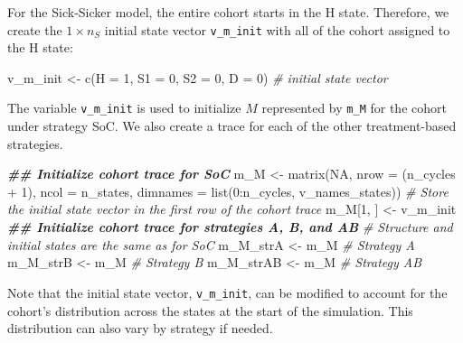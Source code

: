 \documentclass[
]{article}
\newenvironment{Shaded}{\begin{snugshade}}{\end{snugshade}}
\newcommand{\AttributeTok}[1]{\textcolor[rgb]{0.77,0.63,0.00}{#1}}
\newcommand{\CommentTok}[1]{\textcolor[rgb]{0.56,0.35,0.01}{\textit{#1}}}
\newcommand{\ConstantTok}[1]{\textcolor[rgb]{0.00,0.00,0.00}{#1}}
\newcommand{\DecValTok}[1]{\textcolor[rgb]{0.00,0.00,0.81}{#1}}
\newcommand{\DocumentationTok}[1]{\textcolor[rgb]{0.56,0.35,0.01}{\textbf{\textit{#1}}}}
\newcommand{\FunctionTok}[1]{\textcolor[rgb]{0.00,0.00,0.00}{#1}}
\newcommand{\NormalTok}[1]{#1}
\newcommand{\OtherTok}[1]{\textcolor[rgb]{0.56,0.35,0.01}{#1}}
\newcommand{\SpecialCharTok}[1]{\textcolor[rgb]{0.00,0.00,0.00}{#1}}
\begin{document}
For the Sick-Sicker model, the entire cohort starts in the H state. Therefore, we create the \(1 \times n_S\) initial state vector \texttt{v\_m\_init} with all of the cohort assigned to the H state:

\begin{Shaded}
\begin{Highlighting}[]
\NormalTok{v\_m\_init }\OtherTok{\textless{}{-}} \FunctionTok{c}\NormalTok{(}\AttributeTok{H =} \DecValTok{1}\NormalTok{, }\AttributeTok{S1 =} \DecValTok{0}\NormalTok{, }\AttributeTok{S2 =} \DecValTok{0}\NormalTok{, }\AttributeTok{D =} \DecValTok{0}\NormalTok{) }\CommentTok{\# initial state vector}
\end{Highlighting}
\end{Shaded}

The variable \texttt{v\_m\_init} is used to initialize \(M\) represented by \texttt{m\_M} for the cohort under strategy SoC. We also create a trace for each of the other treatment-based strategies.

\begin{Shaded}
\begin{Highlighting}[]
\DocumentationTok{\#\# Initialize cohort trace for SoC}
\NormalTok{m\_M }\OtherTok{\textless{}{-}} \FunctionTok{matrix}\NormalTok{(}\ConstantTok{NA}\NormalTok{, }
              \AttributeTok{nrow =}\NormalTok{ (n\_cycles }\SpecialCharTok{+} \DecValTok{1}\NormalTok{), }\AttributeTok{ncol =}\NormalTok{ n\_states, }
              \AttributeTok{dimnames =} \FunctionTok{list}\NormalTok{(}\DecValTok{0}\SpecialCharTok{:}\NormalTok{n\_cycles, v\_names\_states))}
\CommentTok{\# Store the initial state vector in the first row of the cohort trace}
\NormalTok{m\_M[}\DecValTok{1}\NormalTok{, ] }\OtherTok{\textless{}{-}}\NormalTok{ v\_m\_init}
\DocumentationTok{\#\# Initialize cohort trace for strategies A, B, and AB}
\CommentTok{\# Structure and initial states are the same as for SoC}
\NormalTok{m\_M\_strA  }\OtherTok{\textless{}{-}}\NormalTok{ m\_M }\CommentTok{\# Strategy A}
\NormalTok{m\_M\_strB  }\OtherTok{\textless{}{-}}\NormalTok{ m\_M }\CommentTok{\# Strategy B}
\NormalTok{m\_M\_strAB }\OtherTok{\textless{}{-}}\NormalTok{ m\_M }\CommentTok{\# Strategy AB}
\end{Highlighting}
\end{Shaded}

Note that the initial state vector, \texttt{v\_m\_init}, can be modified to account for the cohort's distribution across the states at the start of the simulation. This distribution can also vary by strategy if needed.
\end{document}

